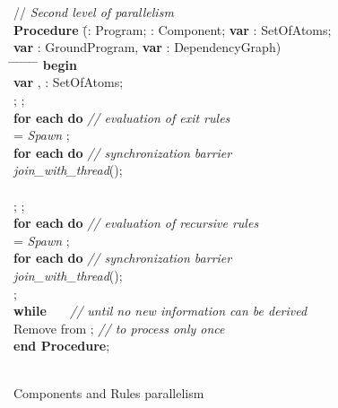 \documentclass[preprint]{tlp}
\begin{document}
\begin{figure}[t!]
\begin{center}
\begin{small}
\begin{tabbing}
// {\em Second level of parallelism}\\
{\bf Procedure} \=(: Program; : Component;
{\bf var} : SetOfAtoms; \\
                                     \> {\bf var} : GroundProgram, {\bf var} : DependencyGraph)\\
\hspace*{0.2cm} \= \kill
\hspace*{0.4cm} \= \hspace*{0.4cm} \= \hspace*{0.4cm} \=
\hspace*{0.4cm} \= \hspace*{0.4cm} \= \hspace*{3cm} \=\kill
{\bf begin} \\
\> {\bf var} , : SetOfAtoms;\\
\> ;  ; \\
\> {\bf for each}  {\bf do} \hspace{1.5cm} {\em // evaluation of exit rules} \\
\>\> = {\em Spawn} ; \\
\> {\bf for each}  {\bf do} \hspace{1.48cm} {\em // synchronization barrier} \\
\>\> {\em join\_with\_thread}(); \\
 \\
\>\> ;  ; \\
\>\>  {\bf for each}  {\bf do}  \hspace{0.2cm} {\em // evaluation of recursive rules} \\
\> \> \>  = {\em Spawn} ; \\
\>\>  {\bf for each}  {\bf do} \hspace{0.2cm} {\em // synchronization barrier} \\
\>\>\> {\em join\_with\_thread}(); \\
\> \> ; \\
\> {\bf while \ \ } \hspace{3.2cm} {\em // until no new information can be derived} \\
\> Remove  from ; \hspace{2.55cm} {\em // to process  only once} \\
{\bf end Procedure}; \\ \\
\end{tabbing}
\end{small}
\caption{Components and Rules parallelism}\label{fig:parallelInstantiation1}
\end{center}
\end{figure}
\end{document}
